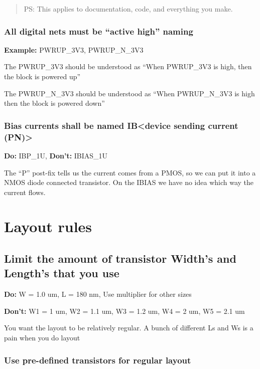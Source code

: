 \begin{quote}
PS: This applies to documentation, code, and everything you make.
\end{quote}

\subsubsection{All digital nets must be ``active high''
naming}\label{all-digital-nets-must-be-active-high-naming}

\textbf{Example:} PWRUP\_3V3, PWRUP\_N\_3V3

The PWRUP\_3V3 should be understood as ``When PWRUP\_3V3 is high, then
the block is powered up''

The PWRUP\_N\_3V3 should be understood as ``When PWRUP\_N\_3V3 is high
then the block is powered down''

\subsubsection{Bias currents shall be named IB\textless device sending
current
(P\textbar N)\textgreater{}}\label{bias-currents-shall-be-named-ibdevice-sending-current-pn}

\textbf{Do:} IBP\_1U, \textbf{Don't:} IBIAS\_1U

The ``P'' post-fix tells us the current comes from a PMOS, so we can put
it into a NMOS diode connected transistor. On the IBIAS we have no idea
which way the current flows.

\section{Layout rules}\label{layout-rules}

\subsection{Limit the amount of transistor Width's and Length's that you
use}\label{limit-the-amount-of-transistor-widths-and-lengths-that-you-use}

\textbf{Do:} W = 1.0 um, L = 180 nm, Use multiplier for other sizes

\textbf{Don't:} W1 = 1 um, W2 = 1.1 um, W3 = 1.2 um, W4 = 2 um, W5 = 2.1
um

You want the layout to be relatively regular. A bunch of different Ls
and Ws is a pain when you do layout

\subsubsection{Use pre-defined transistors for regular
layout}\label{use-pre-defined-transistors-for-regular-layout}

